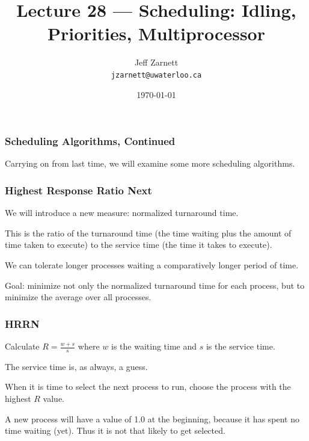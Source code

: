 

\title{Lecture 28 --- Scheduling: Idling, Priorities, Multiprocessor }

\author{Jeff Zarnett \\ \small \texttt{jzarnett@uwaterloo.ca}}
\date{\today}




\begin{frame}
  \titlepage

 \end{frame}



\begin{frame}
\frametitle{Scheduling Algorithms, Continued}

Carrying on from last time, we will examine some more scheduling algorithms.

\end{frame}

\begin{frame}
\frametitle{Highest Response Ratio Next}

We will introduce a new measure: \alert{normalized turnaround time}. 

This is the ratio of the turnaround time (the time waiting plus the amount of time taken to execute) to the service time (the time it takes to execute). 

We can tolerate longer processes waiting a comparatively longer period of time. 

Goal: minimize not only the normalized turnaround time for each process, but to minimize the average over all processes.


\end{frame}

\begin{frame}
\frametitle{HRRN}

Calculate $R = \frac{w + s}{s}$ 
where $w$ is the waiting time and $s$ is the service time. 

The service time is, as always, a guess. 

When it is time to select the next process to run, choose the process with the highest $R$ value. 

A new process will have a value of 1.0 at the beginning, because it has spent no time waiting (yet). Thus it is not that likely to get selected.


\end{frame}

